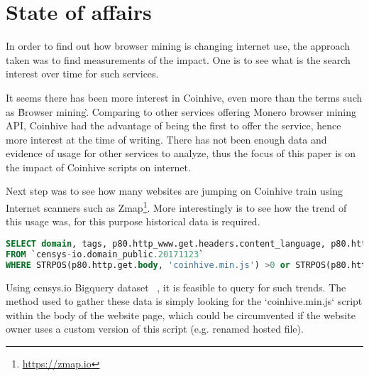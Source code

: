 
\section{State of affairs}
In order to find out how browser mining is changing internet use, the approach taken was to find measurements of the impact. One is to see what is the search interest over time for such services. 

\begin{center}
	\caption{Google Trend - Search interest over last 12 months}
\end{center}

It seems there has been more interest in Coinhive, even more than the terms such as \`Browser mining\`. Comparing to other services offering Monero browser mining API, Coinhive had the advantage of being the first to offer the service, hence more interest at the time of writing. There has not been enough data and evidence of usage for other services to analyze, thus the focus of this paper is on the impact of Coinhive scripts on internet. 

Next step was to see how many websites are jumping on Coinhive train using Internet scanners such as Zmap\footnote{\url{https://zmap.io}}. More interestingly is to see how the trend of this usage was, for this purpose historical data is required. 

\begin{lstlisting}[caption={BigQuery SQL query to find websites using coinhive miner script},label={lst:bigquery},language=sql]
SELECT domain, tags, p80.http_www.get.headers.content_language, p80.http_www.get.headers.server, p80.http.get.headers.x_powered_by, p80.http.get.title , p80.http_www.get.body as wwwbody, p80.http.get.body as plainbody
FROM `censys-io.domain_public.20171123`
WHERE STRPOS(p80.http.get.body, 'coinhive.min.js') >0 or STRPOS(p80.http_www.get.body, 'coinhive.min.js') >0)
\end{lstlisting}


Using censys.io Bigquery dataset ~\cite{censys15}, it is feasible to query for such trends. The method used to gather these data is simply looking for the `coinhive.min.js` script within the body of the website page, which could be circumvented if the website owner uses a custom version of this script (e.g. renamed hosted file).



